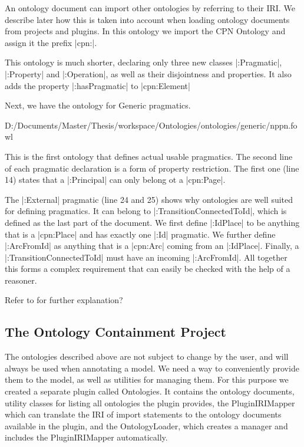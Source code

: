 An ontology document can import other ontologies by referring to their IRI.  We
describe later how this is taken into account when loading ontology documents
from projects and plugins. In this ontology we import the CPN Ontology and
assign it the prefix |cpn:|.

This ontology is much shorter, declaring only three new classes |:Pragmatic|,
|:Property| and |:Operation|, as well as their disjointness and properties. It
also adds the property |:hasPragmatic| to |cpn:Element|

Next, we have the ontology for Generic pragmatics.


{D:/Documents/Master/Thesis/workspace/Ontologies/ontologies/generic/nppn.fowl}

This is the first ontology that defines actual usable pragmatics. The second
line of each pragmatic declaration is a form of property restriction. The first
one (line 14) states that a |:Principal| can only belong ot a |cpn:Page|.

The |:External| pragmatic (line 24 and 25) shows why ontologies are well suited
for defining pragmatics. It can belong to |:TransitionConnectedToId|, which is
defined as the last part of the document. We first define |:IdPlace| to be
anything that is a |cpn:Place| and has exactly one |:Id| pragmatic. We further
define |:ArcFromId| as anything that is a |cpn:Arc| coming from an |:IdPlace|.
Finally, a |:TransitionConnectedToId| must have an incoming |:ArcFromId|. All
together this forms a complex requirement that can easily be checked with the
help of a reasoner.

Refer to \cite{Simonsen2011} for further explanation?

\subsection{The Ontology Containment Project}
The ontologies described above are not subject to change by the user, and will
always be used when annotating a model. We need a way to conveniently provide
them to the model, as well as utilities for managing them. For this purpose we
created a separate plugin called Ontologies. It contains the ontology documents,
utility classes for listing all ontologies the plugin provides, the
PluginIRIMapper which can translate the IRI of import statements to the ontology
documents available in the plugin, and the OntologyLoader, which creates a
manager and includes the PluginIRIMapper automatically.

